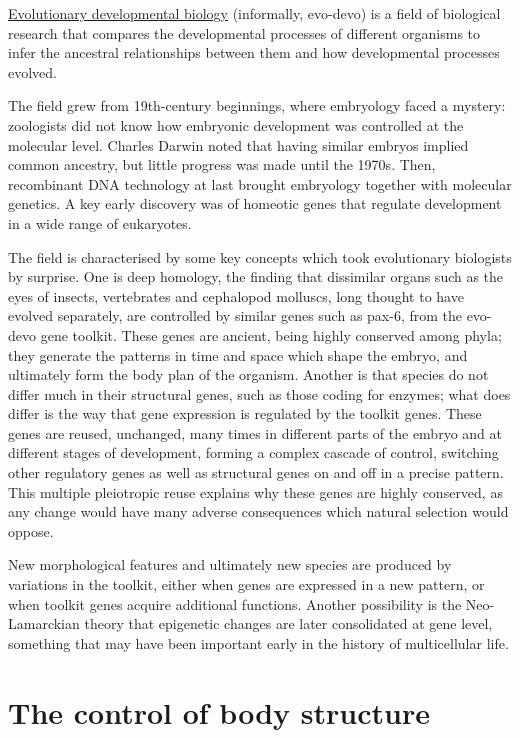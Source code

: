 \href{https://en.wikipedia.org/wiki/Evolutionary_developmental_biology}{Evolutionary developmental biology} (informally, evo-devo) is a field of biological research that compares the developmental processes of different organisms to infer the ancestral relationships between them and how developmental processes evolved.

The field grew from 19th-century beginnings, where embryology faced a mystery: zoologists did not know how embryonic development was controlled at the molecular level. Charles Darwin noted that having similar embryos implied common ancestry, but little progress was made until the 1970s. Then, recombinant DNA technology at last brought embryology together with molecular genetics. A key early discovery was of homeotic genes that regulate development in a wide range of eukaryotes.

The field is characterised by some key concepts which took evolutionary biologists by surprise. One is deep homology, the finding that dissimilar organs such as the eyes of insects, vertebrates and cephalopod molluscs, long thought to have evolved separately, are controlled by similar genes such as pax-6, from the evo-devo gene toolkit. These genes are ancient, being highly conserved among phyla; they generate the patterns in time and space which shape the embryo, and ultimately form the body plan of the organism. Another is that species do not differ much in their structural genes, such as those coding for enzymes; what does differ is the way that gene expression is regulated by the toolkit genes. These genes are reused, unchanged, many times in different parts of the embryo and at different stages of development, forming a complex cascade of control, switching other regulatory genes as well as structural genes on and off in a precise pattern. This multiple pleiotropic reuse explains why these genes are highly conserved, as any change would have many adverse consequences which natural selection would oppose.

New morphological features and ultimately new species are produced by variations in the toolkit, either when genes are expressed in a new pattern, or when toolkit genes acquire additional functions. Another possibility is the Neo-Lamarckian theory that epigenetic changes are later consolidated at gene level, something that may have been important early in the history of multicellular life.

\hypertarget{the-control-of-body-structure}{%
\section{The control of body structure}\label{the-control-of-body-structure}}

